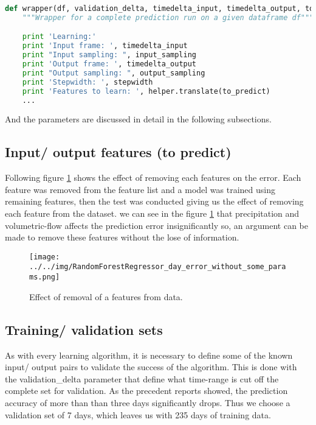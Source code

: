 \documentclass{scrartcl}
\begin{document}
\begin{lstlisting}[language=Python]
def wrapper(df, validation_delta, timedelta_input, timedelta_output, to_predict, input_sampling, output_sampling, stepwidth):
    """Wrapper for a complete prediction run on a given dataframe df"""

    print 'Learning:'
    print 'Input frame: ', timedelta_input
    print "Input sampling: ", input_sampling
    print 'Output frame: ', timedelta_output
    print "Output sampling: ", output_sampling
    print 'Stepwidth: ', stepwidth
    print 'Features to learn: ', helper.translate(to_predict)
    ...
\end{lstlisting}

And the parameters are discussed in detail in the following subsections.


\subsection{Input/ output features (to predict)}
\label{sec_1}
Following figure \ref{fig:feat_remove} shows the effect of removing each features on the error. Each feature was removed from the feature list and a model was trained using remaining features, then the test was conducted giving us the effect of removing each feature from the dataset. we can see in the figure \ref{fig:feat_remove} that precipitation and volumetric-flow affects the prediction error insignificantly so, an argument can be made to remove these features without the lose of information.
\begin{figure}[H]
  \texttt{[image: ../../img/RandomForestRegressor\_day\_error\_without\_some\_params.png]}
  \caption{Effect of removal of a features from data.}
  \label{fig:feat_remove}
\end{figure}

\subsection{Training/ validation sets}
\label{sec_2}
As with every learning algorithm, it is necessary to define some of the known input/ output pairs to validate the success of the algorithm. This is done with the validation\_delta parameter that define what time-range is cut off the complete set for validation. As the precedent reports showed, the prediction accuracy of more than than three days significantly drops. Thus we choose a validation set of 7 days, which leaves us with 235 days of training data.
\end{document}

